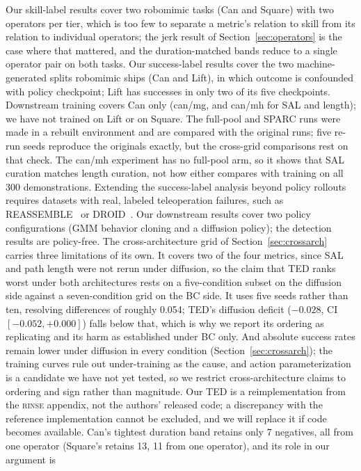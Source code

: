 \documentclass[10pt]{article}
\newcommand{\rinse}{\textmd{\textsc{rinse}}}
\begin{document}
Our skill-label results cover two robomimic tasks (Can and Square) with two
operators per tier, which is too few to separate a metric's relation to
skill from its relation to individual operators; the jerk result of
Section~\ref{sec:operators} is the case where that mattered, and the
duration-matched bands reduce to a single operator pair on both tasks. Our
success-label results cover the two machine-generated splits robomimic
ships (Can and Lift), in which outcome is confounded with policy checkpoint;
Lift has successes in only two of its five checkpoints. Downstream training
covers Can only (can/mg, and can/mh for SAL and length); we have not trained
on Lift or on Square. The full-pool and SPARC runs were made in a rebuilt
environment and are compared with the original runs; five re-run seeds
reproduce the originals exactly, but the cross-grid comparisons rest on that
check. The can/mh experiment has no full-pool arm, so it shows that SAL
curation matches length curation, not how either compares with training on
all 300 demonstrations. Extending the
success-label analysis beyond policy rollouts requires datasets with real, labeled teleoperation
failures, such as \mbox{REASSEMBLE}~\citep{reassemble} or
DROID~\citep{droid}. Our downstream results cover two policy configurations (GMM behavior
cloning and a diffusion policy); the detection results are policy-free. The
cross-architecture grid of Section~\ref{sec:crossarch} carries three
limitations of its own. It covers two of the four metrics, since SAL and
path length were not rerun under diffusion, so the claim that TED ranks
worst under both architectures rests on a five-condition subset on the
diffusion side against a seven-condition grid on the BC side. It uses five
seeds rather than ten, resolving differences of roughly 0.054; TED's
diffusion deficit ($-0.028$, CI $[-0.052, +0.000]$) falls below that, which
is why we report its ordering as replicating and its harm as established
under BC only. And absolute success rates remain lower under diffusion in
every condition (Section~\ref{sec:crossarch}); the training curves rule out
under-training as the cause, and action parameterization is a candidate we
have not yet tested, so we restrict cross-architecture claims to ordering
and sign rather than magnitude.
Our TED is a reimplementation from the \rinse{} appendix, not the authors'
released code; a discrepancy with the reference implementation cannot be
excluded, and we will replace it if code becomes available. Can's tightest
duration band retains only 7 negatives, all from one operator (Square's
retains 13, 11 from one operator), and its role in our argument is
\end{document}
